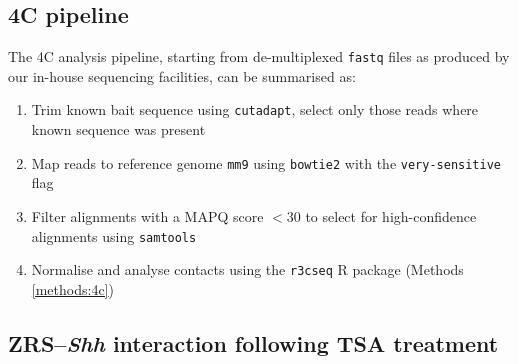 \documentclass[a4paper,11pt,oneside]{book}
\begin{document}
\subsection{4C pipeline}

The 4C analysis pipeline, starting from de-multiplexed \texttt{fastq} files as produced by our in-house sequencing facilities, can be summarised as:

\begin{enumerate}
\item Trim known bait sequence using \texttt{cutadapt},\cite{cutadapt} select only those reads where known sequence was present
\item Map reads to reference genome \texttt{mm9} using \texttt{bowtie2}\cite{Langmead2012} with the \texttt{very-sensitive} flag
\item Filter alignments with a MAPQ score $<30$ to select for high-confidence alignments using \texttt{samtools}\cite{Li2009}
\item Normalise and analyse contacts using the \texttt{r3cseq} R package (Methods \ref{methods:4c})
\end{enumerate}


\subsection{ZRS--\emph{Shh} interaction following TSA treatment}
\end{document}
